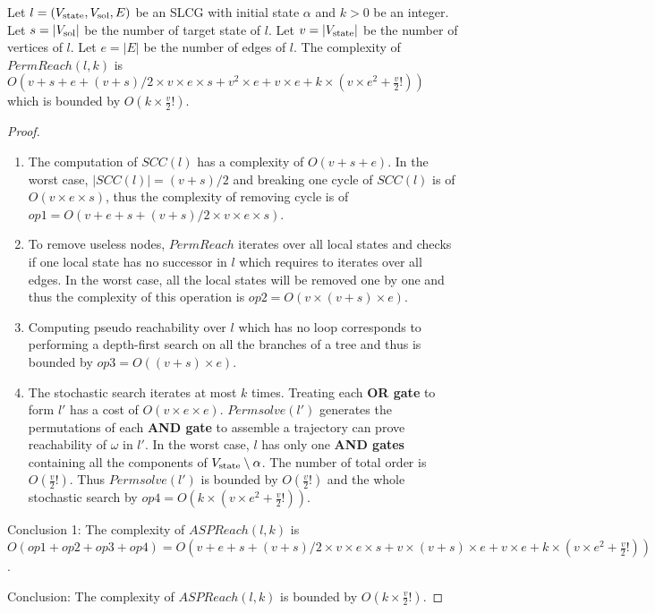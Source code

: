 \begin{theorem}\label{th:PermReachComplexity}
    Let $l=(V_{\mathrm{state}},V_{\mathrm{sol}}, E)$ be an SLCG with initial state $\alpha$ and $k > 0$ be an integer.
    Let $s=|V_{\mathrm{sol}}|$ be the number of target state of $l$.
    Let $v = |V_{\mathrm{state}}|$ be the number of vertices of $l$.
    Let $e=|E|$ be the number of edges of $l$.
    The complexity of $PermReach(l,k)$ is $O(v + s + e + (v+s) / 2 \times v \times e \times s + v^{2} \times e + v \times e + k \times (v \times e^{2} + \frac{v}{2}!))$ which is bounded by $O(k \times \frac{v}{2}!)$.
    \begin{proof}
    \begin{enumerate}
    
        \item  The computation of $SCC(l)$ has a complexity of $O(v + s + e)$.
        In the worst case, $|SCC(l)| = (v+s) / 2$ and breaking one cycle of $SCC(l)$ is of $O(v \times e \times s)$, thus the complexity of removing cycle is of $op1=O(v+ e + s + (v+s) / 2 \times v \times e \times s)$.
        
        \item To remove useless nodes, $PermReach$ iterates over all local states and checks if one local state has no successor in $l$ which requires to iterates over all edges.
        In the worst case, all the local states will be removed one by one and thus the complexity of this operation is $op2=O(v \times (v+s) \times e)$.
        
        \item Computing pseudo reachability over $l$ which has no loop corresponds to performing a depth-first search on all the branches of a tree and thus is bounded by $op3=O((v+s) \times e)$.
        
        \item The stochastic search iterates at most $k$ times.
        Treating each \textbf{OR gate} to form $l'$ has a cost of $O(v \times e \times e)$.
        $Permsolve(l')$ generates the permutations of each \textbf{AND gate} to assemble a trajectory can prove reachability of $\omega$ in $l'$.
        In the worst case, $l$ has only one \textbf{AND gates} containing all the components of $V_{\mathrm{state}}\setminus\alpha$.
        The number of total order is $O(\frac{v}{2}!)$.
        Thus $Permsolve(l')$ is bounded by $O(\frac{v}{2}!)$ and the whole stochastic search by $op4=O(k \times (v \times e^{2} + \frac{v}{2}!))$.
           
        \end{enumerate}
        Conclusion 1: The complexity of $ASPReach(l,k)$ is $O(op1 + op2 + op3 + op4) = O(v + e + s + (v+s) / 2  \times v \times e \times s + v \times (v+s) \times e + v \times e + k \times (v \times e^{2} + \frac{v}{2}!))$.
        
        Conclusion: The complexity of $ASPReach(l,k)$ is bounded by $O(k \times \frac{v}{2}!)$.
    \end{proof}
\end{theorem}



